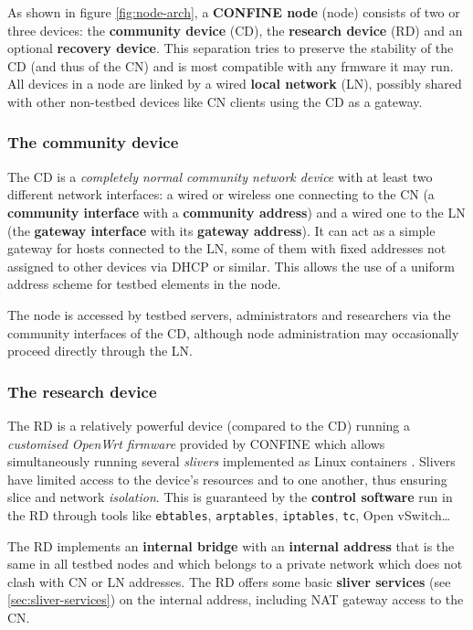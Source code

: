 \documentclass[conference]{IEEEtran}
\begin{document}
As shown in figure \ref{fig:node-arch}, a \textbf{CONFINE node} (node)
consists of two or three devices: the \textbf{community device} (CD), the
\textbf{research device} (RD) and an optional \textbf{recovery device}.  This
separation tries to preserve the stability of the CD (and thus of the CN) and
is most compatible with any frmware it may run.  All devices in a node are
linked by a wired \textbf{local network} (LN), possibly shared with other
non-testbed devices like CN clients using the CD as a gateway.

\subsubsection{The community device}

The CD is a \emph{completely normal community network device} with at least
two different network interfaces: a wired or wireless one connecting to the CN
(a \textbf{community interface} with a \textbf{community address}) and a wired
one to the LN (the \textbf{gateway interface} with its \textbf{gateway
  address}).  It can act as a simple gateway for hosts connected to the LN,
some of them with fixed addresses not assigned to other devices via DHCP or
similar.  This allows the use of a uniform address scheme for testbed elements
in the node.

The node is accessed by testbed servers, administrators and researchers via
the community interfaces of the CD, although node administration may
occasionally proceed directly through the LN.

\subsubsection{The research device}

The RD is a relatively powerful device (compared to the CD) running a
\emph{customised OpenWrt firmware} provided by CONFINE which allows simultaneously running
several \emph{slivers} implemented as Linux containers \cite{lxc}.
Slivers have limited access to the device's resources and to one another, thus
ensuring slice and network \emph{isolation}.  This is guaranteed by the
\textbf{control software} run in the RD through tools like \texttt{ebtables},
\texttt{arptables}, \texttt{iptables}, \texttt{tc}, Open vSwitch…


The RD implements an \textbf{internal bridge} with an \textbf{internal
  address} that is the same in all testbed nodes and which belongs to a
private network which does not clash with CN or LN addresses.  The RD offers
some basic \textbf{sliver services} (see \ref{sec:sliver-services}) on the
internal address, including NAT gateway access to the CN.
\end{document}
